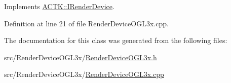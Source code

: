 Implements \hyperlink{class_a_c_t_k_1_1_i_render_device_aa3b875c7f072e701e703d97b3fb4db44}{A\-C\-T\-K\-::\-I\-Render\-Device}.



Definition at line 21 of file Render\-Device\-O\-G\-L3x.\-cpp.



The documentation for this class was generated from the following files\-:\begin{DoxyCompactItemize}
\item 
src/\-Render\-Device\-O\-G\-L3x/\hyperlink{_render_device_o_g_l3x_8h}{Render\-Device\-O\-G\-L3x.\-h}\item 
src/\-Render\-Device\-O\-G\-L3x/\hyperlink{_render_device_o_g_l3x_8cpp}{Render\-Device\-O\-G\-L3x.\-cpp}\end{DoxyCompactItemize}
